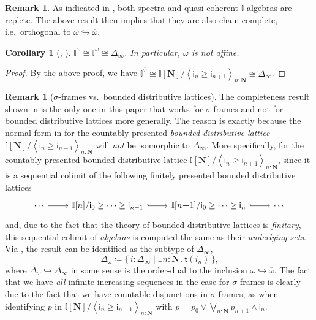 \documentclass[a4paper,12pt]{amsart}
\newtheorem{corollary}[theorem]{Corollary}
\theoremstyle{definition}
\newtheorem{remark}[theorem]{Remark}
\newcommand{\mb}[1]{\mathbf{#1}}
\newcommand{\mbb}[1]{\mathbb{#1}}
\newcommand{\I}{\mbb I}
\newcommand{\ms}[1]{\mathsf{#1}}
\newcommand{\ov}[1]{\overline{#1}}
\newcommand{\pair}[1]{\left\langle#1\right\rangle}
\newcommand{\scomp}[2]{\{\,#1\mid#2\,\}}
\newcommand{\hook}{\hookrightarrow}
\newcommand{\N}{\mb N}
\newcommand{\ex}[2]{\exists #1\!\colon\!\!#2\mathpunct{.}}
\newcommand\istsym{\ms{t}}
\newcommand\ist[1]{\istsym(#1)}
\begin{document}
\begin{remark}
  As indicated in , both spectra and quasi-coherent $\I$-algebras are replete. The above result then implies that they are also chain complete, i.e.\ orthogonal to $\omega\hook\ov\omega$.
\end{remark}

\begin{corollary}[\AxiomNT, \AxiomSQCC]
  $\I^{\ov\omega} \cong \I^\omega \cong \Delta_\infty$. In particular, $\omega$ is not affine.
\end{corollary}
\begin{proof}
  By the above proof, we have $\I^{\ov\omega} \cong \I[\N]/\pair{\ms{i}_n \ge \ms{i}_{n+1}}_{n:\N} \cong \Delta_\infty$.
\end{proof}

\begin{remark}[$\sigma$-frames vs.\ bounded distributive lattices]\label{rem:whynotdis}
  The completeness result shown in  is the only one in this paper that works for $\sigma$-frames and not for bounded distributive lattices more generally. The reason is exactly because the normal form in  for the countably presented \emph{bounded distributive lattice} $\I[\N]/\pair{\ms{i}_n \ge \ms{i}_{n+1}}_{n:\N}$ will \emph{not} be isomorphic to $\Delta_\infty$. More specifically, for the countably presented bounded distributive lattice $\I[\N]/\pair{\ms{i}_n \ge \ms{i}_{n+1}}_{n:\N}$, since it is a sequential colimit of the following finitely presented bounded distributive lattices
  \[ 
  \begin{tikzcd}
    \cdots \ar[r] & \I[n]/\ms{i}_{0} \ge \cdots \ge \ms{i}_{n-1} \ar[r, hook] & \I[n\!+\!1]/\ms{i}_0 \ge \cdots \ge \ms{i}_n \ar[r, hook] & \cdots
  \end{tikzcd}
  \]
  and, due to the fact that the theory of bounded distributive lattices is \emph{finitary}, this sequential colimit of \emph{algebras} is computed the same as their \emph{underlying sets}. Via , the result can be identified as the subtype of $\Delta_\infty$,
  \[ \Delta_\omega \coloneq \scomp{i : \Delta_\infty}{\ex n\N \ist{i_n}}\text{,} \]
  where $\Delta_\omega \hook \Delta_\infty$ in some sense is the order-dual to the inclusion $\omega\hook\ov\omega$. The fact that we have \emph{all} infinite increasing sequences in the case for $\sigma$-frames is clearly due to the fact that we have countable disjunctions in $\sigma$-frames, as when identifying $p$ in $\I[\N]/\pair{\ms{i}_n \ge \ms{i}_{n+1}}_{n:\N}$ with $p = p_0 \vee \bigvee_{n:\N}p_{n+1}\wedge \ms{i}_n$.
\end{remark}
\end{document}
